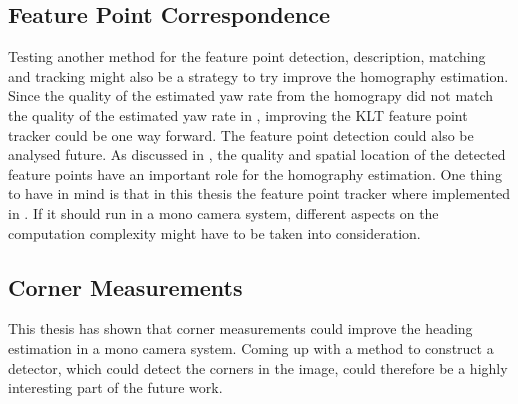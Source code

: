 \subsection{Feature Point Correspondence}
Testing another method for the feature point detection, description, matching and tracking might also be a strategy to try improve the homography estimation.
Since the quality of the estimated yaw rate from the homograpy did not match the quality of the estimated yaw rate in \cite{Gabb:2013}, improving the KLT feature point tracker could be one way forward.
The feature point detection could also be analysed future.
As discussed in , the quality and spatial location of the detected feature points have an important role for the homography estimation.
One thing to have in mind is that in this thesis the feature point tracker where implemented in \matlab.
If it should run in a mono camera system, different aspects on the computation complexity might have to be taken into consideration.

\subsection{Corner Measurements}
This thesis has shown that corner measurements could improve the heading estimation in a mono camera system.
Coming up with a method to construct a detector, which could detect the corners in the image, could therefore be a highly interesting part of the future work.